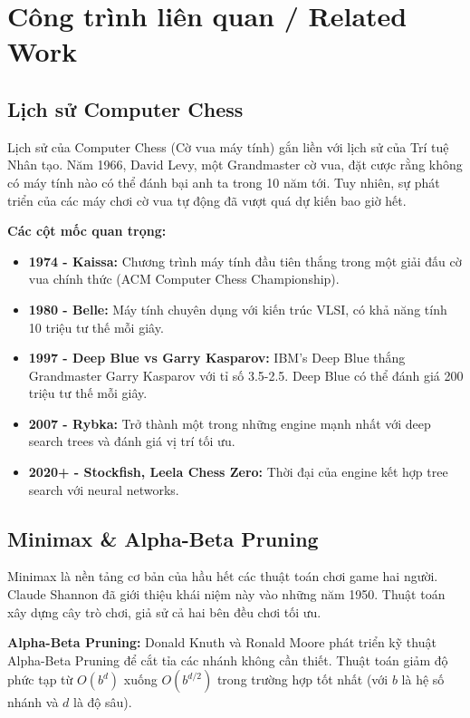 \section{Công trình liên quan / Related Work}

\subsection{Lịch sử Computer Chess}
Lịch sử của Computer Chess (Cờ vua máy tính) gắn liền với lịch sử của Trí tuệ Nhân tạo. Năm 1966, David Levy, một Grandmaster cờ vua, đặt cược rằng không có máy tính nào có thể đánh bại anh ta trong 10 năm tới. Tuy nhiên, sự phát triển của các máy chơi cờ vua tự động đã vượt quá dự kiến bao giờ hết.

\textbf{Các cột mốc quan trọng:}
\begin{itemize}
    \item \textbf{1974 - Kaissa:} Chương trình máy tính đầu tiên thắng trong một giải đấu cờ vua chính thức (ACM Computer Chess Championship).
    \item \textbf{1980 - Belle:} Máy tính chuyên dụng với kiến trúc VLSI, có khả năng tính 10 triệu tư thế mỗi giây.
    \item \textbf{1997 - Deep Blue vs Garry Kasparov:} IBM's Deep Blue thắng Grandmaster Garry Kasparov với tỉ số 3.5-2.5. Deep Blue có thể đánh giá 200 triệu tư thế mỗi giây.
    \item \textbf{2007 - Rybka:} Trở thành một trong những engine mạnh nhất với deep search trees và đánh giá vị trí tối ưu.
    \item \textbf{2020+ - Stockfish, Leela Chess Zero:} Thời đại của engine kết hợp tree search với neural networks.
\end{itemize}

\subsection{Minimax \& Alpha-Beta Pruning}
Minimax là nền tảng cơ bản của hầu hết các thuật toán chơi game hai người. Claude Shannon đã giới thiệu khái niệm này vào những năm 1950. Thuật toán xây dựng cây trò chơi, giả sử cả hai bên đều chơi tối ưu.

\textbf{Alpha-Beta Pruning:} Donald Knuth và Ronald Moore phát triển kỹ thuật Alpha-Beta Pruning để cắt tỉa các nhánh không cần thiết. Thuật toán giảm độ phức tạp từ $O(b^d)$ xuống $O(b^{d/2})$ trong trường hợp tốt nhất (với $b$ là hệ số nhánh và $d$ là độ sâu).

